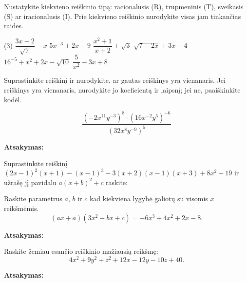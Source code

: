 \documentclass[12pt]{exam}
\newcommand{\atsakymas}{%
    \par\vspace{0.3cm}
    \textbf{Atsakymas:} \framebox[7cm]{\rule{0pt}{0.7cm}}
}
\begin{document}
\begin{questions}

\question[6] Nustatykite kiekvieno reiškinio tipą: racionalusis (R), trupmeninis (T), sveikasis (S) ar iracionalusis (I). Prie kiekvieno reiškinio nurodykite visas jam tinkančias raides.
\droppoints
\begin{tasks}[label-width=1.2em](3)
\task $\dfrac{3x-2}{\sqrt7}-x$
\task $5x^{-3}+2x-9$
\task $\dfrac{x^2+1}{x+2}+\sqrt3$
\task $\sqrt{7-2x}+3x-4$
\task $16^{-5}+x^2+2x-\sqrt{10}$
\task $\dfrac5{x^2}-3x+8$
\end{tasks}



\question[5] Suprastinkite reiškinį ir nurodykite, ar gautas reiškinys yra vienanaris. Jei reiškinys yra vienanaris, nurodykite jo koeficientą ir laipsnį; jei ne, paaiškinkite kodėl.

\droppoints
    $$\displaystyle\frac{(-2x^{11}y^{-3})^8\cdot(16x^{-2}y^5)^{-6}}{(32x^8y^{-9})^5}$$

\vspace{3cm}
\atsakymas

\question Suprastinkite reiškinį $(2x-1)^2(x+1)-(x-1)^3-3(x+2)(x-1)(x+3)+8x ^{2} -19
$ ir užrašę jį pavidalu $a(x+b)^2+c$ raskite:


\question[5] Raskite parametrus $a$, $b$ ir $c$ kad kiekviena lygybė galiotų su visomis $x$ reikšmėmis.
\droppoints
$$(ax+a)(3x^2-bx+c)=-6x^3+4x^2+2x-8.$$

\vspace{5cm}
\atsakymas

\question[4] Raskite žemiau esančio reiškinio mažiausią reikšmę:
\droppoints
$$4x^2+9y^2+z^2+12x-12y-10z+40.$$

\vspace{5cm}
\atsakymas

\end{questions}
\end{document}
